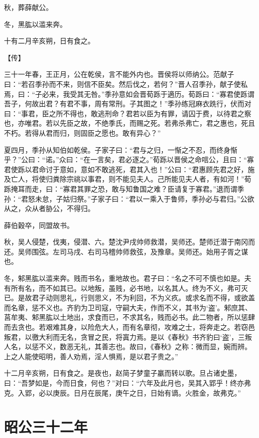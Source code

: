 \documentclass[a4paper,12pt,UTF8,twoside]{ctexbook}
\begin{document}
秋，葬薛献公。

冬，黑肱以滥来奔。

十有二月辛亥朔，日有食之。

【传】

三十一年春，王正月，公在乾侯，言不能外内也。晋侯将以师纳公。范献子曰：“若召季孙而不来，则信不臣矣。然后伐之，若何？”晋人召季孙，献子使私焉，曰：“子必来，我受其无咎。”季孙意如会晋荀跞于適历。荀跞曰：“寡君使跞谓吾子，何故出君？有君不事，周有常刑。子其图之！”季孙练冠麻衣跣行，伏而对曰：“事君，臣之所不得也，敢逃刑命？君若以臣为有罪，请囚于费，以待君之察也，亦唯君。若以先臣之故，不绝季氏，而赐之死。若弗杀弗亡，君之惠也，死且不朽。若得从君而归，则固臣之愿也。敢有异心？”

夏四月，季孙从知伯如乾侯。子家子曰：“君与之归，一惭之不忍，而终身惭乎？”公曰：“诺。”众曰：“在一言矣，君必逐之。”荀跞以晋侯之命唁公，且曰：“寡君使跞以君命讨于意如，意如不敢逃死，君其入也！”公曰：“君惠顾先君之好，施及亡人，将使归粪除宗祧以事君，则不能见夫人。己所能见夫人者，有如河！”荀跞掩耳而走，曰：“寡君其罪之恐，敢与知鲁国之难？臣请复于寡君。”退而谓季孙：“君怒未怠，子姑归祭。”子家子曰：“君以一乘入于鲁师，季孙必与君归。”公欲从之，众从者胁公，不得归。

薛伯穀卒，同盟故书。

秋，吴人侵楚，伐夷，侵潜、六。楚沈尹戌帅师救潜，吴师还。楚师迁潜于南冈而还。吴师围弦。左司马戌、右司马稽帅师救弦，及豫章。吴师还。始用子胥之谋也。

冬，邾黑肱以滥来奔。贱而书名，重地故也。君子曰：“名之不可不慎也如是。夫有所有名，而不如其已。以地叛，虽贱，必书地，以名其人。终为不义，弗可灭已。是故君子动则思礼，行则思义，不为利回，不为义疚。或求名而不得，或欲盖而名章，惩不义也。齐豹为卫司寇，守嗣大夫，作而不义，其书为‘盗’。邾庶其、莒牟夷、邾黑肱以土地出，求食而已，不求其名，贱而必书。此二物者，所以惩肆而去贪也。若艰难其身，以险危大人，而有名章彻，攻难之士，将奔走之。若窃邑叛君，以徼大利而无名，贪冒之民，将寘力焉。是以《春秋》书齐豹曰‘盗’，三叛人名，以惩不义，数恶无礼，其善志也。故曰，《春秋》之称：微而显，婉而辨。上之人能使昭明，善人劝焉，淫人惧焉，是以君子贵之。”

十二月辛亥朔，日有食之。是夜也，赵简子梦童子臝而转以歌。旦占诸史墨，曰：“吾梦如是，今而日食，何也？”对曰：“六年及此月也，吴其入郢乎！终亦弗克。入郢，必以庚辰。日月在辰尾，庚午之日，日始有谪。火胜金，故弗克。”


\section{昭公三十二年}
\end{document}
